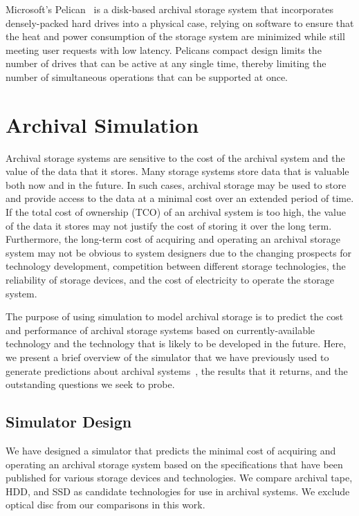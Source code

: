 Microsoft's Pelican~\cite{pelican} is a disk-based archival storage system that incorporates densely-packed hard drives into a physical case, relying on software to ensure that the heat and power consumption of the storage system are minimized while still meeting user requests with low latency.  Pelicans compact design limits the number of drives that can be active at any single time, thereby limiting the number of simultaneous operations that can be supported at once.

\section{Archival Simulation}
Archival storage systems are sensitive to the cost of the archival system and the value of the data that it stores.  Many storage systems store data that is valuable both now and in the future.  In such cases, archival storage may be used to store and provide access to the data at a minimal cost over an extended period of time.  If the total cost of ownership (TCO) of an archival system is too high, the value of the data it stores may not justify the cost of storing it over the long term.  Furthermore, the long-term cost of acquiring and operating an archival storage system may not be obvious to system designers due to the changing prospects for technology development, competition between different storage technologies, the reliability of storage devices, and the cost of electricity to operate the storage system.

The purpose of using simulation to model archival storage is to predict the cost and performance of archival storage systems based on currently-available technology and the technology that is likely to be developed in the future.  Here, we present a brief overview of the simulator that we have previously used to generate predictions about archival systems~\cite{byronmaster}, the results that it returns, and the outstanding questions we seek to probe.

\subsection{Simulator Design}
We have designed a simulator that predicts the minimal cost of acquiring and operating an archival storage system based on the specifications that have been published for various storage devices and technologies.  We compare archival tape, HDD, and SSD as candidate technologies for use in archival systems.  We exclude optical disc from our comparisons in this work.

